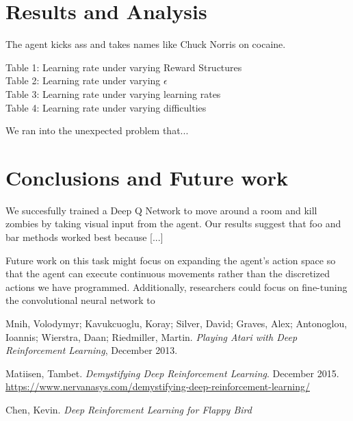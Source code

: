 \documentclass{article}
\begin{document}
\begin{multicols}{2}
\section{Results and Analysis}

The agent kicks ass and takes names like Chuck Norris on cocaine.

\begin{description}
    \item[Table 1: Learning rate under varying Reward Structures]
    \item[Table 2: Learning rate under varying $\epsilon$]
    \item[Table 3: Learning rate under varying learning rates]
    \item[Table 4: Learning rate under varying difficulties]
\end{description}

We ran into the unexpected problem that...



\section{Conclusions and Future work}
We succesfully trained a Deep Q Network to move around a room and kill zombies by taking visual input from the agent.
Our results suggest that foo and bar methods worked best because [...]

Future work on this task might focus on expanding the agent's action space so that the agent can execute continuous movements rather than the discretized actions we have programmed.
Additionally, researchers could focus on fine-tuning the convolutional neural network to

\end{multicols}





\pagebreak
\begin{thebibliography}{9}


Mnih, Volodymyr; Kavukcuoglu, Koray; Silver, David; Graves, Alex; Antonoglou, Ioannis; Wierstra, Daan; Riedmiller, Martin.
\emph{Playing Atari with Deep Reinforcement Learning},
December 2013.

Matiisen, Tambet.
\emph{Demystifying Deep Reinforcement Learning}. December 2015.
\url{https://www.nervanasys.com/demystifying-deep-reinforcement-learning/}

Chen, Kevin.
\emph{Deep Reinforcment Learning for Flappy Bird}


\end{thebibliography}
\end{document}
